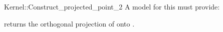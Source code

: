 \begin{ccRefFunctionObjectConcept}{Kernel::Construct_projected_point_2}
A model for this must provide:


       {returns the orthogonal projection of  onto .}

\end{ccRefFunctionObjectConcept}
